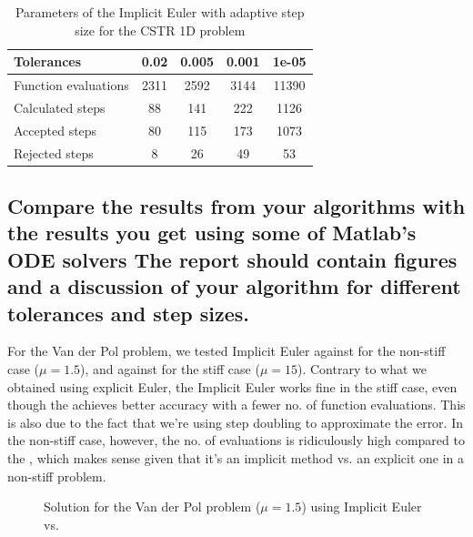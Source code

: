 \begin{table}[H]
    \centering
    \begin{tabular}{@{}l|cccc@{}}
    \toprule
    Tolerances           & 0.02 & 0.005 & 0.001 & 1e-05 \\ \midrule
    Function evaluations & 2311 & 2592  & 3144  & 11390 \\
    Calculated steps     & 88   & 141   & 222   & 1126  \\
    Accepted steps       & 80   & 115   & 173   & 1073  \\
    Rejected steps       & 8    & 26    & 49    & 53    \\ \bottomrule
    \end{tabular}
    \caption{Parameters of the Implicit Euler with adaptive step size for the CSTR 1D problem}
    \label{3_5_1D_tols_table}
\end{table}


\subsection{Compare the results from your algorithms with the results you get using some  of  Matlab's  ODE  solvers  The  report  should  contain  figures  and  a discussion of your algorithm for different tolerances and step sizes.}
For the Van der Pol problem, we tested Implicit Euler against  for the non-stiff case ($\mu = 1.5$), and against  for the stiff case ($\mu = 15$). Contrary to what we obtained using explicit Euler, the Implicit Euler works fine in the stiff case, even though the  achieves better accuracy with a fewer no. of function evaluations. This is also due to the fact that we're using step doubling to approximate the error. In the non-stiff case, however, the no. of evaluations is ridiculously high compared to the , which makes sense given that it's an implicit method vs. an explicit one in a non-stiff problem.

\begin{figure}[H]
    \centering
    \caption{Solution for the Van der Pol problem ($\mathit{\mu = 1.5}$) using Implicit Euler vs. }
    \label{3_6_mu_1_5}
\end{figure}

